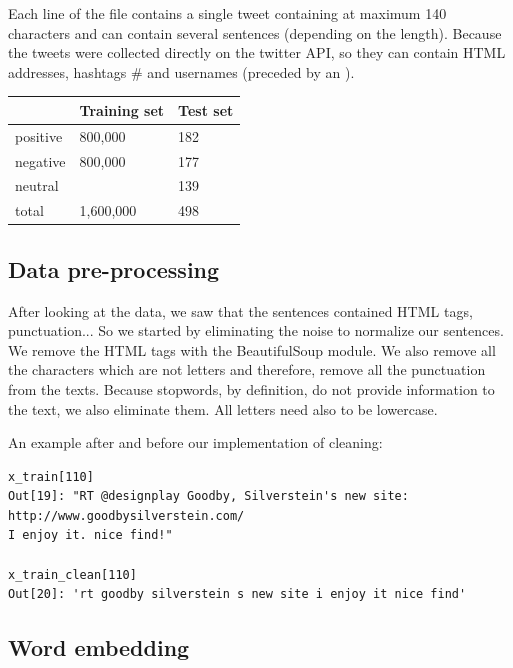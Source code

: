 \documentclass{article}
\begin{document}
Each line of the file contains a single tweet containing at maximum 140 characters and can contain several sentences (depending on the length). Because the tweets were collected directly on the twitter API, so they can contain HTML addresses, hashtags \# and usernames (preceded by an \@). 

\begin{table}[]
\begin{tabular}{l|l|l|}
\cline{2-3}
\textbf{}                      & \textbf{Training set} & \textbf{Test set} \\ \hline
\multicolumn{1}{|l|}{positive} & 800,000               & 182               \\ \hline
\multicolumn{1}{|l|}{negative} & 800,000               & 177               \\ \hline
\multicolumn{1}{|l|}{neutral}  &                       & 139               \\ \hline
\multicolumn{1}{|l|}{total}    & 1,600,000             & 498               \\ \hline
\end{tabular}
\end{table}

\subsection{Data pre-processing}

After looking at the data, we saw that the sentences contained HTML tags, punctuation... So we started by eliminating the noise to normalize our sentences.
We remove the HTML tags with the BeautifulSoup module. We also remove all the characters which are not letters and therefore, remove all the punctuation from the texts. Because stopwords, by definition, do not provide information to the text, we also eliminate them. All letters need also to be lowercase.

An example after and before our implementation of cleaning:

\begin{verbatim}
x_train[110]
Out[19]: "RT @designplay Goodby, Silverstein's new site: http://www.goodbysilverstein.com/ 
I enjoy it. nice find!"

x_train_clean[110]
Out[20]: 'rt goodby silverstein s new site i enjoy it nice find'
\end{verbatim}

\subsection{Word embedding}
\end{document}
